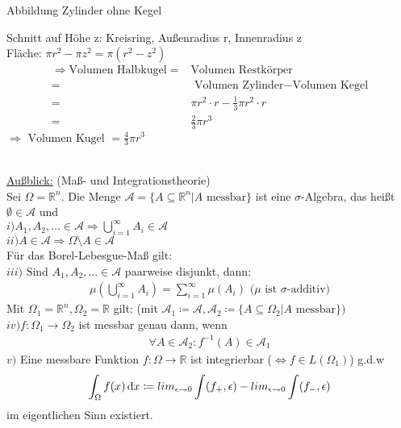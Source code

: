 \begin{minipage}{0.333\textwidth}
    Abbildung Zylinder ohne Kegel
\end{minipage}
\begin{minipage}{0.666\textwidth}
    Schnitt auf Höhe z: Kreisring, Außenradius r, Innenradius z\\
    Fläche: $\pi r^2 - \pi z^2 = \pi(r^2-z^2)$\\
    \begin{align*}
        \Rightarrow \text{Volumen Halbkugel} = &\text{Volumen Restkörper}\\
        = & \text{ Volumen Zylinder} - \text{Volumen Kegel}\\
        = & \pi r^2 \cdot r - \frac{1}{3} \pi r^2\cdot r\\
        = & \frac{2}{3} \pi r^3
    \end{align*}
    $\Rightarrow \text{ Volumen Kugel } = \frac{4}{3} \pi r^3$
\end{minipage}
\\
\underline{Außblick:} (Maß- und Integrationstheorie)\\
Sei $\Omega = \mathbb{R}^n$. Die Menge $\mathscr{A} = \{A \subseteq \mathbb{R}^n | A \text{ messbar}\}$ ist eine $\sigma$-Algebra, das heißt $\emptyset \in \mathscr{A}$ und\\
$i) A_1, A_2, \dots \in \mathscr{A} \Rightarrow \bigcup_{i=1}^\infty A_i \in \mathscr{A}$\\
$ii) A\in\mathscr{A} \Rightarrow\Omega\setminus A\in\mathscr{A}$\\
Für das Borel-Lebesgue-Maß gilt:\\
$iii) \text{ Sind } A_1, A_2, \dots \in \mathscr{A}$ paarweise disjunkt, dann:
\begin{align*}
    \mu \left(\bigcup_{i=1}^\infty A_i \right) = \sum_{i=1}^\infty \mu (A_i) \text{ ($\mu$ ist $\sigma$-additiv)}
\end{align*}
Mit $\Omega_1 = \mathbb{R}^n, \Omega_2 = \mathbb{R}$ gilt: (mit $\mathscr{A}_1 \coloneqq \mathscr{A}, \mathscr{A}_2 \coloneqq \{A\subseteq\Omega_2| A \text{ messbar}\})$\\
$iv) f\colon \Omega_1\to\Omega_2$ ist messbar genau dann, wenn
\begin{align*}
    \forall A\in\mathscr{A}_2 \colon f^{-1}(A) \in \mathscr{A}_1
\end{align*}
$v)$ Eine messbare Funktion $f\colon\Omega\to\mathbb{R}$ ist integrierbar ($\Leftrightarrow f\in L(\Omega_1)$) g.d.w
\begin{align*}
    \int_{\Omega} f(x) \,\text{d}x \coloneqq lim_{\epsilon \rightharpoondown 0} \int (f_+, \epsilon) - lim_{\epsilon \rightharpoondown 0} \int (f_-, \epsilon)
\end{align*} im eigentlichen Sinn existiert.\\

